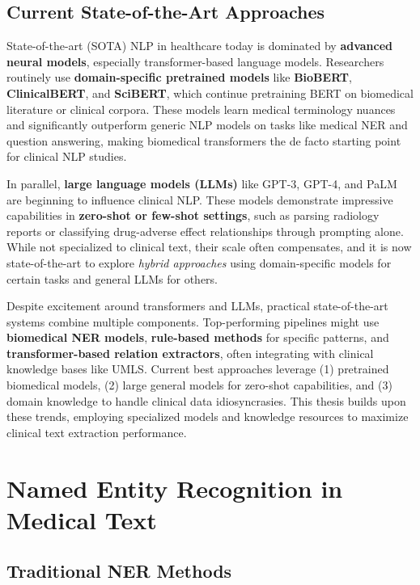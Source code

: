 \subsection{Current State-of-the-Art Approaches}

State-of-the-art (SOTA) NLP in healthcare today is dominated by \textbf{advanced neural models}, especially transformer-based language models. Researchers routinely use \textbf{domain-specific pretrained models} like \textbf{BioBERT}, \textbf{ClinicalBERT}, and \textbf{SciBERT}, which continue pretraining BERT on biomedical literature or clinical corpora. These models learn medical terminology nuances and significantly outperform generic NLP models on tasks like medical NER and question answering, making biomedical transformers the de facto starting point for clinical NLP studies.

In parallel, \textbf{large language models (LLMs)} like GPT-3, GPT-4, and PaLM are beginning to influence clinical NLP. These models demonstrate impressive capabilities in \textbf{zero-shot or few-shot settings}, such as parsing radiology reports or classifying drug-adverse effect relationships through prompting alone. While not specialized to clinical text, their scale often compensates, and it is now state-of-the-art to explore \emph{hybrid approaches} using domain-specific models for certain tasks and general LLMs for others.

Despite excitement around transformers and LLMs, practical state-of-the-art systems combine multiple components. Top-performing pipelines might use \textbf{biomedical NER models}, \textbf{rule-based methods} for specific patterns, and \textbf{transformer-based relation extractors}, often integrating with clinical knowledge bases like UMLS. Current best approaches leverage (1) pretrained biomedical models, (2) large general models for zero-shot capabilities, and (3) domain knowledge to handle clinical data idiosyncrasies. This thesis builds upon these trends, employing specialized models and knowledge resources to maximize clinical text extraction performance.

\section{Named Entity Recognition in Medical Text}

\subsection{Traditional NER Methods}


